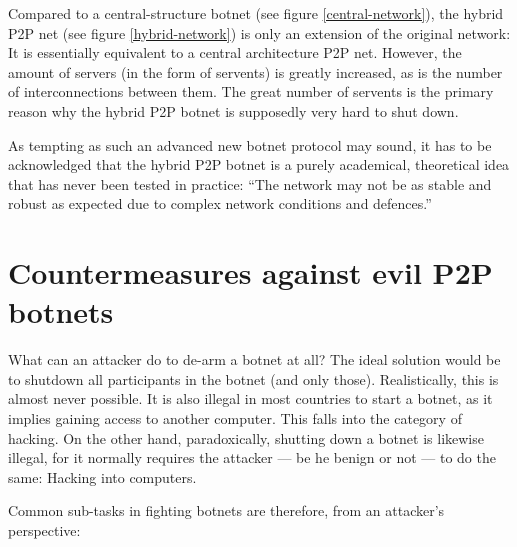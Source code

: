 \documentclass{llncs}
\begin{document}
Compared to a central-structure botnet (see figure
\ref{central-network}), the hybrid P2P net (see figure
\ref{hybrid-network}) is only an extension of the original network: It
is essentially equivalent to a central architecture P2P net. However,
the amount of servers (in the form of servents) is greatly increased,
as is the number of interconnections between them. The great number of
servents is the primary reason why the hybrid P2P botnet is supposedly
very hard to shut down.\cite{td1sc}

As tempting as such an advanced new botnet protocol may sound, it has
to be acknowledged that the hybrid P2P botnet is a purely academical,
theoretical idea that has never been tested in practice: ``The network
may not be as stable and robust as expected due to complex network
conditions and defences.''\cite{wang2009systematic}


\section{Countermeasures against evil P2P botnets}
\label{counter-measure}
What can an attacker do to de-arm a botnet at all? The ideal solution
would be to shutdown all participants in the botnet (and only
those). Realistically, this is almost never possible. It is also
illegal in most countries to start a botnet, as it implies gaining
access to another computer. This falls into the category of
hacking. On the other hand, paradoxically, shutting down a botnet is
likewise illegal, for it normally requires the attacker --- be he
benign or not --- to do the same: Hacking into computers. 

Common sub-tasks in fighting botnets are therefore, from an attacker's
perspective:
\end{document}
